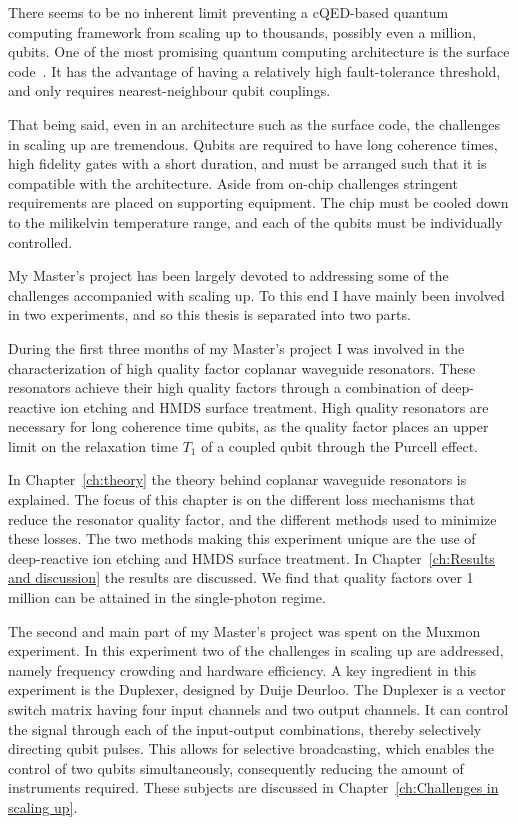 \documentclass[12pt]{report}
\begin{document}
  There seems to be no inherent limit preventing a cQED-based quantum computing framework from scaling up to thousands, possibly even a million, qubits. One of the most promising quantum computing architecture is the surface code~\cite{bravyi1998quantum}. It has the advantage of having a relatively high fault-tolerance threshold, and only requires nearest-neighbour qubit couplings.

  That being said, even in an architecture such as the surface code, the challenges in scaling up are tremendous. Qubits are required to have long coherence times, high fidelity gates with a short duration, and must be arranged such that it is compatible with the architecture. Aside from on-chip challenges stringent requirements are placed on supporting equipment. The chip must be cooled down to the milikelvin temperature range, and each of the qubits must be individually controlled.

  My Master's project has been largely devoted to addressing some of the challenges accompanied with scaling up. To this end I have mainly been involved in two experiments, and so this thesis is separated into two parts.

  During the first three months of my Master's project I was involved in the characterization of high quality factor coplanar waveguide resonators. These resonators achieve their high quality factors through a combination of deep-reactive ion etching and HMDS surface treatment. High quality resonators are necessary for long coherence time qubits, as the quality factor places an upper limit on the relaxation time $T_1$ of a coupled qubit through the Purcell effect.

  In Chapter~\ref{ch:theory} the theory behind coplanar waveguide resonators is explained. The focus of this chapter is on the different loss mechanisms that reduce the resonator quality factor, and the different methods used to minimize these losses. The two methods making this experiment unique are the use of deep-reactive ion etching and HMDS surface treatment. In Chapter~\ref{ch:Results and discussion} the results are discussed. We find that quality factors over 1 million can be attained in the single-photon regime.

  The second and main part of my Master's project was spent on the Muxmon experiment. In this experiment two of the challenges in scaling up are addressed, namely frequency crowding and hardware efficiency. A key ingredient in this experiment is the Duplexer, designed by Duije Deurloo. The Duplexer is a vector switch matrix having four input channels and two output channels. It can control the signal through each of the input-output combinations, thereby selectively directing qubit pulses. This allows for selective broadcasting, which enables the control of two qubits simultaneously, consequently reducing the amount of instruments required. These subjects are discussed in Chapter~\ref{ch:Challenges in scaling up}.
\end{document}
